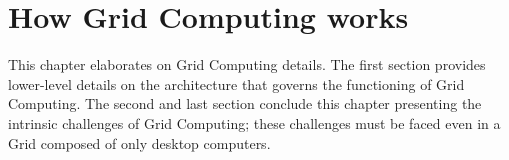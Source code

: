 \chapter{How Grid Computing works}
This chapter elaborates on Grid Computing details. The first section provides lower-level details on the architecture that governs the functioning of Grid Computing. The second and last section conclude this chapter presenting the intrinsic challenges of Grid Computing; these challenges must be faced even in a Grid composed of only desktop computers.



